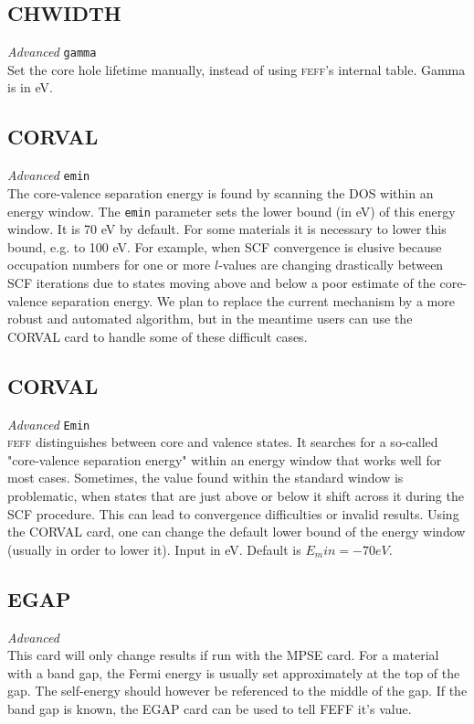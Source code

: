 \documentclass[11pt,oneside]{report} %
\renewcommand{\htmlref}[2]{\hyperlink{#2}{#1}}
\newcommand{\program}[1]{\textsc{#1}}
\newcommand{\feff}{\program{feff}}
\newenvironment{Card}[4]%
      {\vspace{3ex}%
        \subsection{#1}
        \quad\textsl{#3}\newline
        \quad\texttt{#2}\newline%
        \label{card:#4}\\}
      {}
\renewcommand{\htmlref}[2]{{#1}} %
\begin{document}
\begin{Card}{CHWIDTH}{gamma}{Advanced}{chw}
 Set the core hole lifetime manually, instead of using {\feff}'s internal table.  Gamma is in eV.
\end{Card}

\begin{Card}{CORVAL}{emin}{Advanced}{cva}
  The core-valence separation energy is found by scanning the DOS within an energy window.  The \texttt{emin} parameter sets the lower bound (in eV) of this energy window.  It is 70 eV by default.  For some materials it is necessary to lower this bound, e.g. to 100 eV.  For example, when SCF convergence is elusive because occupation numbers for one or more $l$-values are changing drastically between SCF iterations due to states moving above and below a poor estimate of the core-valence separation energy.  We plan to replace the current mechanism by a more robust and automated algorithm, but in the meantime users can use the CORVAL card to handle some of these difficult cases.
\end{Card}

\begin{Card}{CORVAL}{Emin}{Advanced}{crv}
 {\feff} distinguishes between core and valence states.  It searches for a so-called "core-valence separation energy" within an energy window that works well for most cases.  Sometimes, the value found within the standard window is problematic, when states that are just above or below it shift across it during the SCF procedure.  This can lead to convergence difficulties or invalid results.  Using the CORVAL card, one can change the default lower bound of the energy window (usually in order to lower it).  Input in eV.  Default is $E_min = -70eV$.
\end{Card} 

\begin{Card}{EGAP}{}{Advanced}{ega}
  This card will only change results if run with the \htmlref{MPSE}{card:mps} card.
  For a material with a band gap, the Fermi energy is usually set
  approximately at the top of the gap. The self-energy should however
  be referenced to the middle of the gap. If the band gap is known,
  the EGAP card can be used to tell FEFF it's value.
\end{Card}
\end{document}
